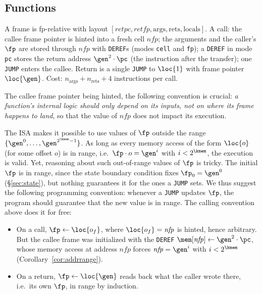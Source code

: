 \subsection{Functions}\label{sec:prog-functions}

A frame is fp-relative with layout $[\mathit{retpc},\mathit{retfp},\mathrm{args},\mathrm{rets},\mathrm{locals}]$. A call: the callee frame pointer is hinted into a fresh cell $\mathit{nfp}$; the arguments and the caller's $\fp$ are stored through $\mathit{nfp}$ with \texttt{DEREF}s (modes \texttt{cell} and \texttt{fp}); a \texttt{DEREF} in mode \texttt{pc} stores the return address $\gen^{2}\cdot\pc$ (the instruction after the transfer); one \texttt{JUMP} enters the callee. Return is a single \texttt{JUMP} to $\loc{1}$ with frame pointer $\loc{\gen}$. Cost: $n_{\mathrm{args}}+n_{\mathrm{rets}}+4$ instructions per call.

The callee frame pointer being hinted, the following convention is crucial: \textit{a function's internal logic should only depend on its inputs, not on where its frame happens to land}, so that the value of $\mathit{nfp}$ does not impact its execution.

The ISA makes it possible to use values of $\fp$ outside the range $\{\gen^{0},\dots,\gen^{2^{\kmem}-1}\}$. As long as every memory access of the form $\loc{o}$ (for some offset $o$) is in range, i.e.\ $\fp\cdot o=\gen^{i}$ with $i<2^{\kmem}$, the execution is valid. Yet, reasoning about such out-of-range values of $\fp$ is tricky. The initial $\fp$ is in range, since the state boundary condition fixes $\fp_{0}=\gen^{0}$ (\S\ref{sec:state}), but nothing guarantees it for the ones a \texttt{JUMP} sets. We thus suggest the following programming convention: whenever a \texttt{JUMP} updates $\fp$, the program should guarantee that the new value is in range. The calling convention above does it for free:

\begin{itemize}
\item On a call, $\fp\gets\loc{o_f}$, where $\loc{o_f}=\mathit{nfp}$ is hinted, hence arbitrary. But the callee frame was initialized with the \texttt{DEREF} $\mem[\mathit{nfp}]\gets\gen^{2}\cdot\pc$, whose memory access at address $\mathit{nfp}$ forces $\mathit{nfp}=\gen^{i}$ with $i<2^{\kmem}$ (Corollary~\ref{cor:addrrange}).
\item On a return, $\fp\gets\loc{\gen}$ reads back what the caller wrote there, i.e.\ its own $\fp$, in range by induction.
\end{itemize}


